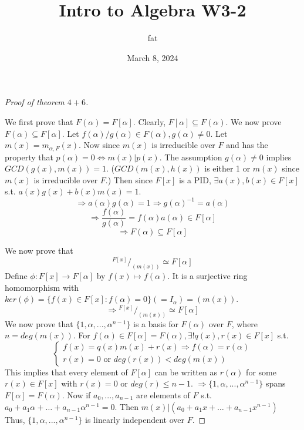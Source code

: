 \documentclass{article}
\title{Intro to Algebra W3-2}
\author{fat}
\date{March 8, 2024}
\theoremstyle{definition}
\newenvironment{proofs}[1][\proofname]{%
  \begin{proof}[#1]$ $\par\nobreak\ignorespaces
}{%
  \end{proof}
}
\newcommand*\quot[2]{{^{\textstyle #1}\big/_{\textstyle #2}}}
\begin{document}
\maketitle
\thispagestyle{fancy}
\renewcommand{\footrulewidth}{0.4pt}
\cfoot{\thepage}
\renewcommand{\headrulewidth}{0.4pt}

\begin{proofs}[Proof of theorem $4 + 6$]
	We first prove that $F(\alpha) = F[\alpha]$.
	Clearly, $F[\alpha] \subseteq F(\alpha)$. 
	We now prove $F(\alpha) \subseteq F[\alpha]$.
	Let $f(\alpha)/g(\alpha) \in F(\alpha), g(\alpha) \neq 0$.
	Let $m(x) = m_{\alpha, F}(x)$.
	Now since $m(x)$ is irreducible over $F$ and has the property that $p(\alpha) = 0 \Leftrightarrow m(x) | p(x)$.
	The assumption $g(\alpha) \neq 0$ implies $GCD(g(x), m(x)) = 1$.
	($GCD(m(x), h(x))$ is either 1 or $m(x)$ since $m(x)$ is irreducible over $F$.)
	Then since $F[x]$ is a PID, $\exists a(x), b(x) \in F[x]$ s.t. $a(x) g(x) + b(x) m(x) = 1$.
	\[
		\Rightarrow a(\alpha) g(\alpha) = 1 \Rightarrow g(\alpha)^{-1} = a(\alpha)
	\]
	\[
		\Rightarrow \frac{f(\alpha)}{g(\alpha)} = f(\alpha) a(\alpha) \in F[\alpha]
	\]
	\[
		\Rightarrow F(\alpha) \subseteq F[\alpha]
	\]
	\par We now prove that 
	\[
		\quot{F[x]}{(m(x))} \simeq F[\alpha]
	\]
	Define $\phi: F[x] \to F[\alpha]$ by $f(x) \mapsto f(\alpha)$.
	It is a surjective ring homomorphism with $ker(\phi) = \{f(x) \in F[x]: f(\alpha) = 0\}(= I_\alpha) = (m(x))$.
	\[
		\Rightarrow \quot{F[x]}{(m(x))} \simeq F[\alpha]
	\]
	We now prove that $\{1, \alpha, ..., \alpha^{n - 1} \}$ is a basis for $F(\alpha)$ over $F$, where $n = deg(m(x))$.
	For $f(\alpha) \in F[\alpha] = F(\alpha), \exists ! q(x), r(x) \in F[x]$ s.t.
	\[
		\begin{cases}
			f(x) = q(x) m(x) + r(x) \Rightarrow f(\alpha) = r(\alpha)\\
			r(x) = 0 \text{ or } deg(r(x)) < deg(m(x))
		\end{cases}
	\]
	This implies that every element of $F[\alpha]$ can be written as $r(\alpha)$ for some $r(x) \in F[x]$ with $r(x) = 0$ or $deg(r) \leq n - 1$.
	$\Rightarrow \{1, \alpha, ..., \alpha^{n - 1} \}$ spans $F[\alpha] = F(\alpha)$.
	Now if $a_0, ..., a_{n - 1}$ are elements of $F$ s.t. $a_0 + a_1 \alpha + \hdots + a_{n -1} \alpha^{n - 1} = 0$.
	Then $m(x) | (a_0 + a_1 x + \hdots + a_{n- 1} x^{n-  1})$
	Thus, $\{1, \alpha, ..., \alpha^{n - 1}\}$ is linearly independent over $F$.
\end{proofs}
\end{document}
